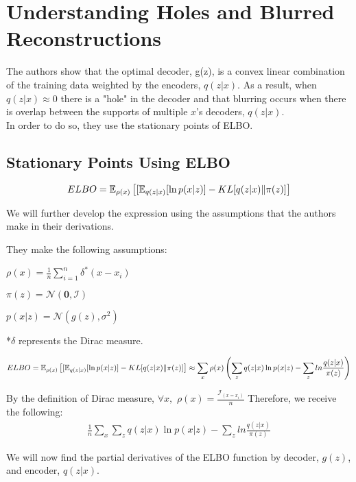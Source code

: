 \chapter*{Understanding Holes and Blurred Reconstructions}
The authors show that the optimal decoder, g(z), is a convex linear combination of the training data weighted by the encoders, $q(z|x)$.
As a result, when $q(z|x)\approx 0$ there is a "hole" in the decoder and that blurring occurs when there is overlap between the supports of multiple $x$'s decoders, $q(z|x)$.\\
In order to do so, they use the stationary points of ELBO.

\section*{Stationary Points Using ELBO}
\begin{gather*}
{ELBO} =  \operatorname{\mathbb{E}}_{\rho(x)}\left[[\operatorname{\mathbb{E}}_{q(z|x)}[\ln{p(x|z)}] - KL[q(z|x) \| \pi(z)]\right]
\end{gather*}

We will further develop the expression using the assumptions that the authors make in their derivations.

\raggedright
They make the following assumptions:\par

\centering
$\rho(x) = \frac{1}{n} \sum_{i=1}^{n}\delta^*(x-x_i)$

$\pi(z) = \mathcal{N}(\textbf{0}, \mathcal{I})$

$p(x|z) = \mathcal{N}(g(z), \sigma^2)$
\par

\raggedright
*$\delta$ represents the Dirac measure.
\par

\begin{gather*}
{ELBO} =  \operatorname{\mathbb{E}}_{\rho(x)}\left[[\operatorname{\mathbb{E}}_{q(z|x)}[\ln{p(x|z)}] - KL[q(z|x) \| \pi(z)]\right]
\approx \sum_{x}\rho(x)\left(\sum_{z} q(z|x) \ln{p(x|z)} - \sum_{z} ln \frac{q(z|x)}{\pi(z)}\right)
\end{gather*}

By the definition of Dirac measure, $\forall x,$  $\rho(x) = \frac{\mathcal{I}_{(x=x_i)}}{n}$
Therefore, we receive the following:
\begin{gather*}
\frac{1}{n}\sum_{x}\sum_{z} q(z|x) \ln{p(x|z)} - \sum_{z} ln \frac{q(z|x)}{\pi(z)}
\end{gather*}
\par

We will now find the partial derivatives of the ELBO function by decoder, $g(z)$, and encoder, $q(z|x)$.
\par


